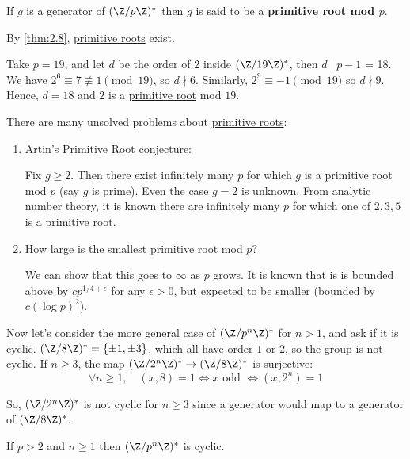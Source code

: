 \documentclass{article}
\begin{document}
\begin{defi}
    If $g$ is a generator of $(\Z / p \Z)^*$ then $g$ is said to be a \textbf{primitive root mod $p$}.
\end{defi}

By \cref{thm:2.8}, \hyperlink{def:primRoot}{primitive roots} exist.

\begin{eg}
    Take $p = 19$, and let $d$ be the order of $2$ inside $(\Z/19\Z)^*$, then $d \mid p-1$ = 18.  We have $2^6 \equiv 7 \not\equiv 1 \pmod{19}$, so $d \nmid 6$.
    Similarly, $2^9 \equiv -1 \pmod{19}$ so $d \nmid 9$.  Hence, $d=18$ and $2$ is a \hyperlink{def:primRoot}{primitive root} mod $19$.
\end{eg}

There are many unsolved problems about \hyperlink{def:primRoot}{primitive roots}:
\begin{enumerate}
    \item Artin's Primitive Root conjecture:

        Fix $g \geq 2$. Then there exist infinitely many $p$ for which $g$ is a primitive root mod $p$ (say $g$ is prime).
        Even the case $g=2$ is unknown.
        From analytic number theory, it is known there are infinitely many $p$ for which one of $2, 3, 5$ is a primitive root.
    \item How large is the smallest primitive root mod $p$?

        We can show that this goes to $\infty$ as $p$ grows.
        It is known that is is bounded above by $c p^{1/4 + \epsilon}$ for any $\epsilon > 0$, but expected to be smaller (bounded by $c (\log p)^2$).
\end{enumerate}

Now let's consider the more general case of $(\Z / p^n \Z)^*$ for $n > 1$, and ask if it is cyclic.
$(\Z / 8 \Z)^* = \{\pm 1, \pm 3\}$, which all have order $1$ or $2$, so the group is not cyclic.  If $n \geq 3$, the map $(\Z/2^n \Z)^* \to (\Z/8 \Z)^*$ is surjective:
\begin{equation*}\forall n \geq 1, \quad (x, 8) = 1 \iff x \text{ odd } \iff (x, 2^n) = 1 \end{equation*}

So, $(\Z/2^n \Z)^*$ is not cyclic for $n \geq 3$ since a generator would map to a generator of $(\Z / 8 \Z)^*$.

\begin{nthm}\label{thm:2.9}
    If $p > 2$ and $n \geq 1$ then $(\Z/p^n \Z)^*$ is cyclic.
\end{nthm}
\end{document}
